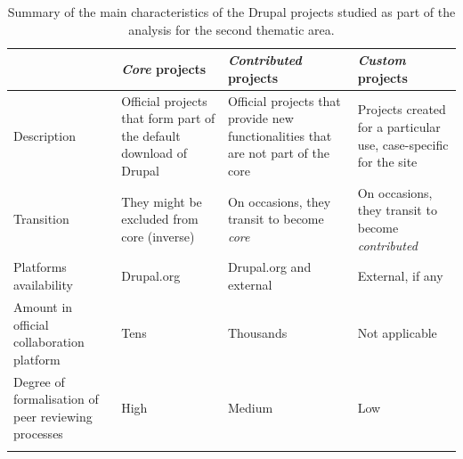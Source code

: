     \begin{footnotesize}
    \begin{longtable}{p{3cm}||p{3cm}|p{3cm}|p{3cm}|}
    \cline{2-4}
& \textit{Core} projects & \textit{Contributed} projects & \textit{Custom} projects                                                 \\ \hline \hline
\multicolumn{1}{|p{3cm}||}{Description} & Official projects that form part of the default download of Drupal & Official projects that provide new functionalities that are not part of the core & Projects created for a particular use, case-specific for the site \\ \hline
\multicolumn{1}{|p{3cm}||}{Transition} & They might be excluded from core (inverse) & On occasions, they transit to become \textit{core}                                        & On occasions, they transit to become \textit{contributed}                \\ \hline
    \multicolumn{1}{|p{3cm}||}{Platforms availability}                              & Drupal.org & Drupal.org and external & External, if any                                                \\ \hline
    \multicolumn{1}{|p{3cm}||}{Amount in official collaboration platform}           & Tens & Thousands & Not applicable                                                  \\ \hline
    \multicolumn{1}{|p{3cm}||}{Degree of formalisation of peer reviewing processes} & High & Medium & Low                                                             \\ \hline
    \caption[Summary of the main characteristics of the Drupal projects studied]{Summary of the main characteristics of the Drupal projects studied as part of the analysis for the second thematic area.}
    \label{project-chars}
    \end{longtable}
    \end{footnotesize}



